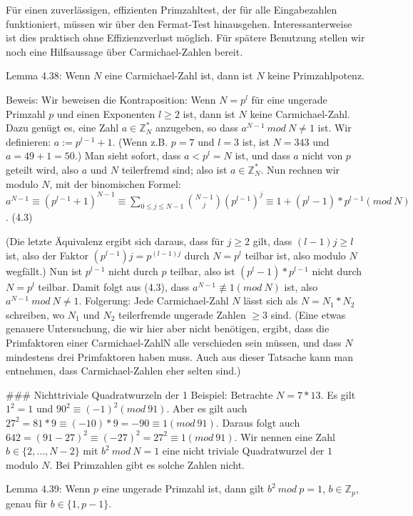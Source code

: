 \documentclass[a4paper]{article}
\begin{document}
\begin{multicols}{3}
Für einen zuverlässigen, effizienten Primzahltest, der für alle Eingabezahlen funktioniert, müssen wir über den Fermat-Test hinausgehen. Interessanterweise ist dies praktisch ohne Effizienzverlust möglich. Für spätere Benutzung stellen wir noch eine Hilfsaussage über Carmichael-Zahlen bereit.

Lemma 4.38: Wenn $N$ eine Carmichael-Zahl ist, dann ist $N$ keine Primzahlpotenz.

Beweis: Wir beweisen die Kontraposition: Wenn $N=p^l$ für eine ungerade Primzahl $p$ und einen Exponenten $l\geq 2$ ist, dann ist $N$ keine Carmichael-Zahl. Dazu genügt es, eine Zahl $a\in\mathbb{Z}^*_N$ anzugeben, so dass $a^{N-1}\ mod\ N\not= 1$ ist. Wir definieren: $a:=p^{l-1} + 1$. (Wenn z.B. $p=7$ und $l=3$ ist, ist $N=343$ und $a=49+1=50$.) Man sieht sofort, dass $a<p^l=N$ ist, und dass $a$ nicht von $p$ geteilt wird, also $a$ und $N$ teilerfremd sind; also ist $a\in\mathbb{Z}^*_N$. Nun rechnen wir modulo $N$, mit der binomischen Formel: $a^{N-1} \equiv (p^{l-1} + 1)^{N-1} \equiv \sum_{0 \leq j\leq N-1} \binom{N-1}{j} (p^{l-1})^j \equiv 1 + (p^l-1)*p^{l-1} (mod\ N)$. (4.3)

(Die letzte Äquivalenz ergibt sich daraus, dass für $j\geq 2$ gilt, dass $(l-1)j\geq l$ ist, also der Faktor $(p^{l-1})j=p^{(l-1)j}$ durch $N=p^l$ teilbar ist, also modulo $N$ wegfällt.) Nun ist $p^{l-1}$ nicht durch $p$ teilbar, also ist $(p^l-1)*p^{l-1}$ nicht durch $N=p^l$ teilbar. Damit folgt aus (4.3), dass $a^{N-1}\not\equiv 1 (mod\ N)$ ist, also $a^{N-1}\ mod\ N\not= 1$. 
Folgerung: Jede Carmichael-Zahl $N$ lässt sich als $N=N_1 *N_2$ schreiben, wo $N_1$ und $N_2$ teilerfremde ungerade Zahlen $\geq 3$ sind.
(Eine etwas genauere Untersuchung, die wir hier aber nicht benötigen, ergibt, dass die Primfaktoren einer Carmichael-ZahlN alle verschieden sein müssen, und dass $N$ mindestens drei Primfaktoren haben muss. Auch aus dieser Tatsache kann man entnehmen, dass Carmichael-Zahlen eher selten sind.)

### Nichttriviale Quadratwurzeln der 1
Beispiel: Betrachte $N=7*13$. Es gilt $1^2 = 1$ und $90^2 \equiv(-1)^2 (mod\ 91)$. Aber es gilt auch $27^2 = 81* 9 \equiv(-10)*9 = -90\equiv 1(mod\ 91)$. Daraus folgt auch
$642 =(91-27)^2 \equiv (-27)^2 = 27^2 \equiv 1 (mod\ 91)$. Wir nennen eine Zahl $b\in\{2,...,N-2\}$ mit $b^2\ mod\ N=1$ eine nicht triviale Quadratwurzel der $1$ modulo $N$. Bei Primzahlen gibt es solche Zahlen nicht.

Lemma 4.39: Wenn $p$ eine ungerade Primzahl ist, dann gilt $b^2\ mod\ p = 1$, $b \in\mathbb{Z}_p$, genau für $b\in\{1 ,p-1\}$.


\end{multicols}
\end{document}
